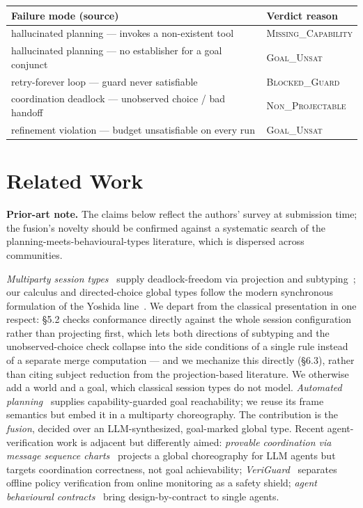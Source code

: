 \documentclass[11pt]{article}
\theoremstyle{plain}
\theoremstyle{definition}
\begin{document}
\begin{center}\small
\begin{tabular}{@{}ll@{}}
\toprule
\textbf{Failure mode (source)} & \textbf{Verdict reason}\\
\midrule
hallucinated planning --- invokes a non-existent tool & \textsc{Missing\_Capability}\\
hallucinated planning --- no establisher for a goal conjunct & \textsc{Goal\_Unsat}\\
retry-forever loop --- guard never satisfiable & \textsc{Blocked\_Guard}\\
coordination deadlock --- unobserved choice / bad handoff & \textsc{Non\_Projectable}\\
refinement violation --- budget unsatisfiable on every run & \textsc{Goal\_Unsat}\\
\bottomrule
\end{tabular}
\end{center}

\section{Related Work}
\noindent\textbf{Prior-art note.} The claims below reflect the authors' survey at
submission time; the fusion's novelty should be confirmed against a systematic
search of the planning-meets-behavioural-types literature, which is dispersed
across communities.

\emph{Multiparty session types}~\cite{honda,liprojection,yoshidagheri} supply
deadlock-freedom via projection and subtyping~\cite{gayhole,ghilezan}; our
calculus and directed-choice global types follow the modern synchronous
formulation of the Yoshida line~\cite{yoshidagheri,ghilezan,scalasyoshida}. We
depart from the classical presentation in one respect: \S5.2 checks conformance
directly against the whole session configuration rather than projecting first,
which lets both directions of subtyping and the unobserved-choice check collapse
into the side conditions of a single rule instead of a separate merge computation
--- and we mechanize this directly (\S6.3), rather than citing subject reduction
from the projection-based literature. We otherwise add a world and a goal, which
classical session types do not model.
\emph{Automated planning}~\cite{strips} supplies capability-guarded goal
reachability; we reuse its frame semantics but embed it in a multiparty
choreography. The contribution is the \emph{fusion}, decided over an
LLM-synthesized, goal-marked global type. Recent agent-verification work is
adjacent but differently aimed: \emph{provable coordination via message sequence
charts}~\cite{msc} projects a global choreography for LLM agents but targets
coordination correctness, not goal achievability; \emph{VeriGuard}~\cite{veriguard}
separates offline policy verification from online monitoring as a safety shield;
\emph{agent behavioural contracts}~\cite{abc} bring design-by-contract to single
agents.
\end{document}
